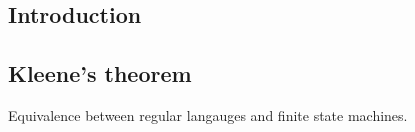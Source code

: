 
\subsection{Introduction}


\subsection{Kleene's theorem}

Equivalence between regular langauges and finite state machines.
